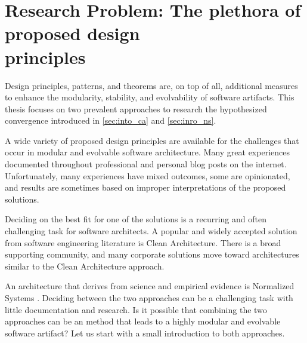 \section{Research Problem: The plethora of proposed design \\ principles}
\label{sec:research_problem}

Design principles, patterns, and theorems are, on top of all, additional measures to
enhance the modularity, stability, and evolvability of software artifacts. This thesis
focuses on two prevalent approaches to research the hypothesized convergence introduced in
\ref{sec:into_ca} and \ref{sec:inro_ns}. 

A wide variety of proposed design principles are available for the challenges that occur
in modular and evolvable software architecture. Many great experiences documented
throughout professional and personal blog posts on the internet. Unfortunately, many
experiences have mixed outcomes, some are opinionated, and results are sometimes based on
improper interpretations of the proposed solutions.

Deciding on the best fit for one of the solutions is a recurring and often challenging task
for software architects. A popular and widely accepted solution from software engineering
literature is Clean Architecture. There is a broad supporting community, and many corporate
solutions move toward architectures similar to the Clean Architecture
approach. 

An architecture that derives from science and empirical evidence is Normalized Systems
\parencite{mannaert_normalized_2009,mannaert_normalized_2016}. Deciding between the two
approaches can be a challenging task with little documentation and research. Is it
possible that combining the two approaches can be an method that leads to a highly modular
and evolvable software artifact? Let us start with a small introduction to both
approaches.